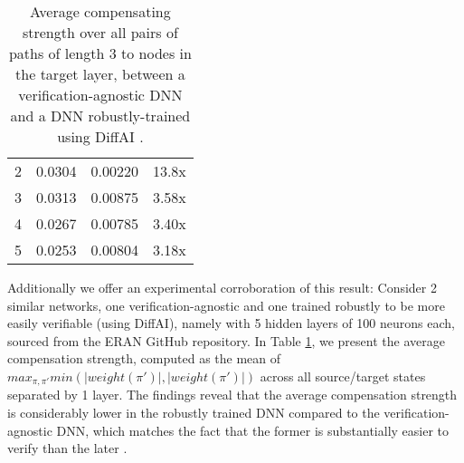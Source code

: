 \begin{table}[t!]
	\centering
	\begin{tabular}{|c|c|c|c|}
		\hline
		\text{Target Layer}  &  \text{Verification-agnostic DNN} & \text{DiffAI-trained DNN} & \text{Ratio} \\ \hline \hline
		2 & 0.0304 & 0.00220  & 13.8x\\ \hline
		3  & 0.0313 & 0.00875 & 3.58x \\ \hline
		4  &  0.0267 & 0.00785 & 3.40x \\ \hline
		5  &  0.0253 & 0.00804  & 3.18x \\ \hline
	\end{tabular}
	\caption{Average compensating strength over all pairs of paths of length 3 to nodes in the target layer, between a verification-agnostic DNN and a DNN robustly-trained using DiffAI \cite{DiffAI}. \vspace{-0.8cm}}
	\label{tab:compensation}
	
\end{table}





Additionally we offer an experimental corroboration of this result:
Consider 2 similar networks, one verification-agnostic and one trained robustly to be more easily verifiable (using DiffAI), namely with 5 hidden layers of 100 neurons each, sourced from the ERAN GitHub repository.
In Table \ref{tab:compensation}, we present the average compensation strength, computed as the mean of $max_{\pi,\pi'} min(|weight(\pi')|,|weight(\pi')|)$ across all source/target states separated by 1 layer. The findings reveal that the average compensation strength is considerably lower in the robustly trained DNN compared to the verification-agnostic DNN, which matches the fact that the former is substantially easier to verify than the later 
\cite{deeppoly}.


